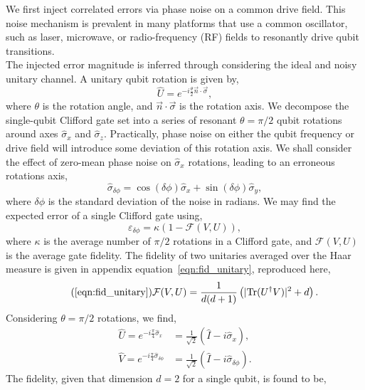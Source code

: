 We first inject correlated errors via phase noise on a common drive field. This noise mechanism is prevalent in many platforms that use a common oscillator, such as laser, microwave, or radio-frequency (RF) fields to resonantly drive qubit transitions. \\
The injected error magnitude is inferred through considering the ideal and noisy unitary channel. 
A unitary qubit rotation is given by,
\begin{equation}
\hat{U} = e^{-i\frac{\theta}{2}\vec n \cdot \vec \sigma},
\end{equation}
where $\theta$ is the rotation angle, and $\vec n \cdot \vec \sigma$ is the rotation axis. 
We decompose the single-qubit Clifford gate set into a series of resonant $\theta=\pi/2$ qubit rotations around axes 
$\hat{\sigma}_x$ and $\hat{\sigma}_z$. Practically, phase noise on either the qubit frequency or drive field will introduce some deviation of this rotation axis. We shall consider the effect of zero-mean phase noise on $\hat{\sigma}_x$ rotations, leading to an erroneous rotations axis,
\begin{equation}
\hat{\sigma}_{\delta\phi} = \cos(\delta\phi)\hat{\sigma}_x + \sin(\delta\phi)\hat{\sigma}_y,
\end{equation}
where $\delta\phi$ is the standard deviation of the noise in radians. We may find the expected error of a single Clifford gate using,
\begin{equation}
\varepsilon_{\delta\phi} = \kappa\left(1-\mathcal{F}(V, U)\right),
\end{equation}
where $\kappa$ is the average number of $\pi/2$ rotations in a Clifford gate, and $\mathcal{F}(V,U)$ is the average gate fidelity. The fidelity of two unitaries averaged over the Haar measure is given in appendix equation~\ref{eqn:fid_unitary}, reproduced here,
\begin{equation}
    \tag{\ref{eqn:fid_unitary}}
    \mathcal{F}(V,U) = \frac{1}{d(d+1)} \left( |\text{Tr}(U^\dagger V)|^2 + d \right).
\end{equation}
Considering $\theta=\pi/2$ rotations, we find,
\begin{align}
    \hat{U} = e^{-i\frac{\pi}{4}\hat{\sigma}_x} &= \frac{1}{\sqrt{2}}\left(\hat{I}-i\hat{\sigma}_x\right),\\
    \hat{V} = e^{-i\frac{\pi}{4}\hat{\sigma}_{\delta\phi}} &= \frac{1}{\sqrt{2}}\left(\hat{I}-i\hat{\sigma}_{\delta\phi}\right).
\end{align}
The fidelity, given that dimension $d=2$ for a single qubit, is found to be,
